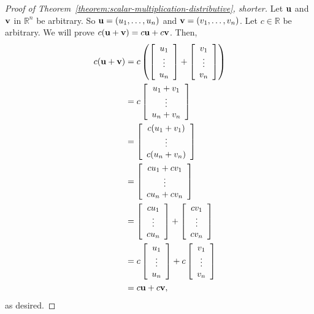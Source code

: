 \documentclass{book}
\theoremstyle{ekimcustom}
\begin{document}
\begin{proof}[Proof of Theorem~\ref{theorem:scalar-multiplication-distributive}, shorter]
Let ${\bf u}$ and ${\bf v}$ in $\mathbb{R}^n$ be arbitrary. So ${\bf u} = (u_1,\dots,u_n)$ and ${\bf v} = (v_1,\dots,v_n)$. Let $c \in \mathbb{R}$ be arbitrary. We will prove $c({\bf u}+{\bf v}) = c{\bf u} + c{\bf v}$. Then,
\begin{align*}
c({\bf u}+{\bf v})
&= c\left( \left[ \begin{array}{c}u_1\\\vdots\\u_n\end{array} \right] + \left[ \begin{array}{c}v_1\\\vdots\\v_n\end{array} \right] \right)\\
&= c\left[ \begin{array}{c}u_1+v_1\\\vdots\\u_n+v_n\end{array} \right]\\
&= \left[ \begin{array}{c}c(u_1+v_1)\\\vdots\\c(u_n+v_n)\end{array} \right]\\
&= \left[ \begin{array}{c}cu_1+cv_1\\\vdots\\cu_n+cv_n\end{array} \right]\\
&= \left[ \begin{array}{c}cu_1\\\vdots\\cu_n\end{array} \right] + \left[ \begin{array}{c}cv_1\\\vdots\\cv_n\end{array} \right]\\
&= c \left[ \begin{array}{c}u_1\\\vdots\\u_n\end{array} \right] + c\left[ \begin{array}{c}v_1\\\vdots\\v_n\end{array} \right] \\
&=c{\bf u}+c{\bf v},
\end{align*}
as desired.
\end{proof}
\end{document}
